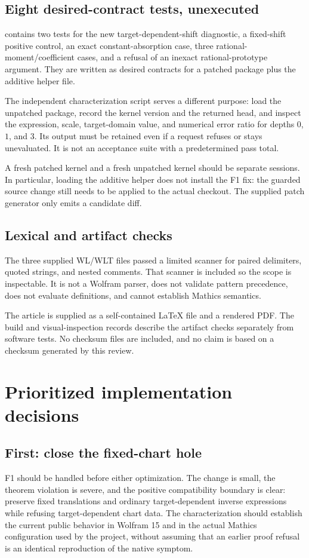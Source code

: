 \documentclass[11pt,letterpaper]{article}
\newcommand{\code}[1]{\texttt{\detokenize{#1}}}
\begin{document}
\subsection{Eight desired-contract tests, unexecuted}
\code{ReviewRegressions.wlt} contains two tests for the new target-dependent-shift diagnostic, a fixed-shift positive control, an exact constant-absorption case, three rational-moment/coefficient cases, and a refusal of an inexact rational-prototype argument. They are written as desired contracts for a patched package plus the additive helper file.

The independent characterization script serves a different purpose: load the unpatched package, record the kernel version and the returned head, and inspect the expression, scale, target-domain value, and numerical error ratio for depths $0$, $1$, and $3$. Its output must be retained even if a request refuses or stays unevaluated. It is not an acceptance suite with a predetermined pass total.

A fresh patched kernel and a fresh unpatched kernel should be separate sessions. In particular, loading the additive helper does not install the F1 fix: the guarded source change still needs to be applied to the actual checkout. The supplied patch generator only emits a candidate diff.

\subsection{Lexical and artifact checks}
The three supplied WL/WLT files passed a limited scanner for paired delimiters, quoted strings, and nested comments. That scanner is included so the scope is inspectable. It is not a Wolfram parser, does not validate pattern precedence, does not evaluate definitions, and cannot establish Mathics semantics.

The article is supplied as a self-contained LaTeX file and a rendered PDF. The build and visual-inspection records describe the artifact checks separately from software tests. No checksum files are included, and no claim is based on a checksum generated by this review.

\section{Prioritized implementation decisions}
\label{sec:roadmap}
\subsection{First: close the fixed-chart hole}
F1 should be handled before either optimization. The change is small, the theorem violation is severe, and the positive compatibility boundary is clear: preserve fixed translations and ordinary target-dependent inverse expressions while refusing target-dependent chart data. The characterization should establish the current public behavior in Wolfram 15 and in the actual Mathics configuration used by the project, without assuming that an earlier proof refusal is an identical reproduction of the native symptom.
\end{document}
